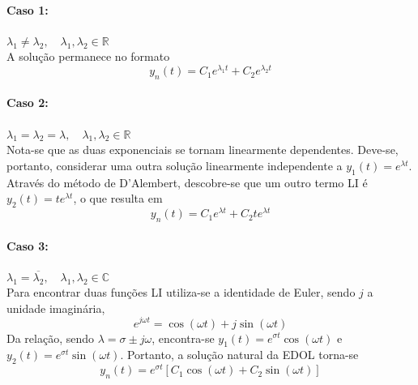 \documentclass{article}
\numberwithin{equation}{section}
\begin{document}
    \paragraph{Caso 1:} $\lambda_{1} \neq \lambda_{2}, \quad \lambda_{1},\lambda_{2} \in \mathbb{R} $ \\
    A solução permanece no formato
    \begin{equation*}
        \displaystyle y_{n}(t)=C_{1}e^{\lambda_{1}t}+C_{2}e^{\lambda_{2}t}
    \end{equation*}

    \paragraph{Caso 2:} $\lambda_{1} = \lambda_{2} = \lambda, \quad \lambda_{1},\lambda_{2} \in \mathbb{R}$ \\
    Nota-se que as duas exponenciais se tornam linearmente dependentes. Deve-se, portanto, considerar uma outra solução linearmente independente a $y_{1}(t)=e^{\lambda t}$. Através do método de D'Alembert, descobre-se que um outro termo LI é $y_{2}(t)=te^{\lambda t}$, o que resulta em
    \begin{equation*}
        \displaystyle y_{n}(t)=C_{1}e^{\lambda t}+C_{2}te^{\lambda t}
    \end{equation*}

    \paragraph{Caso 3:} $\lambda_{1} = \overline{\lambda_{2}}, \quad \lambda_{1},\lambda_{2} \in \mathbb{C}$ \\
    Para encontrar duas funções LI utiliza-se a identidade de Euler, sendo $j$ a unidade imaginária,
    \begin{equation}
        e^{j\omega t}=\cos{(\omega t)}+j\sin{(\omega t)}
    \end{equation}
    Da relação, sendo $\lambda = \sigma \pm j\omega$, encontra-se $y_{1}(t)=e^{\sigma t}\cos{(\omega t)}$ e $y_{2}(t)=e^{\sigma t}\sin{(\omega t)}$. Portanto, a solução natural da EDOL torna-se
    \begin{equation*}
        \displaystyle y_{n}(t)=e^{\sigma t}[C_{1}\cos{(\omega t)}+C_{2}\sin{(\omega t)}]
    \end{equation*}
\end{document}
